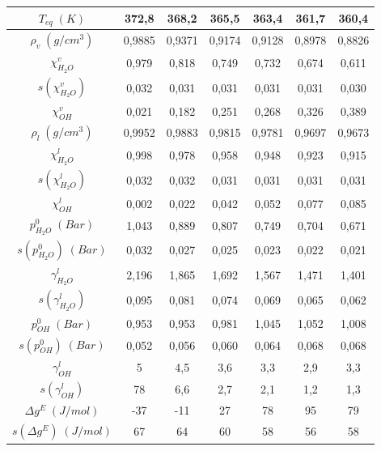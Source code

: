 \documentclass[a4paper,12pt,titlepage]{article}
\begin{document}
\begin{table}[h!]
\centering
\begin{tabular}{|c|c|c|c|c|c|c|}
\hline
$T_{eq}\; (K)$               & 372,8  & 368,2  & 365,5  & 363,4  & 361,7  & 360,4  \\ \hline
$\rho_v\; (g/cm^3)$          & 0,9885 & 0,9371 & 0,9174 & 0,9128 & 0,8978 & 0,8826 \\ \hline
$\chi_{H_2O}^v$             & 0,979  & 0,818  & 0,749  & 0,732  & 0,674  & 0,611  \\ \hline
$s(\chi_{H_2O}^v)$          & 0,032  & 0,031  & 0,031  & 0,031  & 0,031  & 0,030  \\ \hline
$\chi_{OH}^v$               & 0,021  & 0,182  & 0,251  & 0,268  & 0,326  & 0,389  \\ \hline
$\rho_l\; (g/cm^3)$          & 0,9952 & 0,9883 & 0,9815 & 0,9781 & 0,9697 & 0,9673 \\ \hline
$\chi_{H_2O}^l$             & 0,998  & 0,978  & 0,958  & 0,948  & 0,923  & 0,915  \\ \hline
$s(\chi_{H_2O}^l)$          & 0,032  & 0,032  & 0,031  & 0,031  & 0,031  & 0,031  \\ \hline
$\chi_{OH}^l$               & 0,002  & 0,022  & 0,042  & 0,052  & 0,077  & 0,085  \\ \hline
$p_{H_2O}^0 \;(Bar)$         & 1,043  & 0,889  & 0,807  & 0,749  & 0,704  & 0,671  \\ \hline
$s(p_{H_2O}^0) \;(Bar)$      & 0,032  & 0,027  & 0,025  & 0,023  & 0,022  & 0,021  \\ \hline
$\gamma_{H_2O}^l$            & 2,196  & 1,865  & 1,692  & 1,567  & 1,471  & 1,401  \\ \hline
$s(\gamma_{H_2O}^l)$         & 0,095  & 0,081  & 0,074  & 0,069  & 0,065  & 0,062  \\ \hline
$p_{OH}^0 \;(Bar)$           & 0,953  & 0,953  & 0,981  & 1,045  & 1,052  & 1,008  \\ \hline
$s(p_{OH}^0) \;(Bar)$        & 0,052  & 0,056  & 0,060  & 0,064  & 0,068  & 0,068  \\ \hline
$\gamma_{OH}^l$              & 5      & 4,5    & 3,6    & 3,3    & 2,9    & 3,3    \\ \hline
$s(\gamma_{OH}^l)$           & 78     & 6,6    & 2,7    & 2,1    & 1,2    & 1,3    \\ \hline
$\Delta g^{E} \; (J/mol)$    & -37    & -11    & 27     & 78     & 95     & 79     \\ \hline
$s(\Delta g^{E}) \; (J/mol)$ & 67     & 64     & 60     & 58     & 56     & 58     \\ \hline

\end{tabular}
\end{table}
\end{document}
